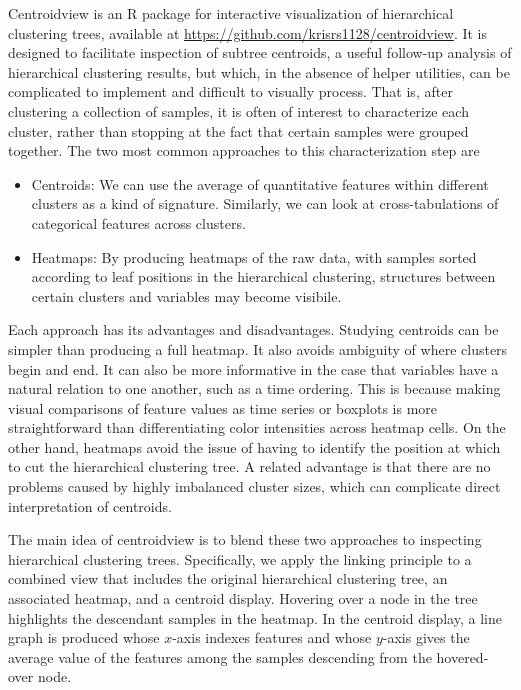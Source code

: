 Centroidview is an R package for interactive visualization of hierarchical
clustering trees, available at \url{https://github.com/krisrs1128/centroidview}.
It is designed to facilitate inspection of subtree centroids, a useful follow-up
analysis of hierarchical clustering results, but which, in the absence of helper
utilities, can be complicated to implement and difficult to visually process.
That is, after clustering a collection of samples, it is often of interest to
characterize each cluster, rather than stopping at the fact that certain samples
were grouped together. The two most common approaches to this characterization
step are
\begin{itemize}
\item Centroids: We can use the average of quantitative features within
  different clusters as a kind of signature. Similarly, we can look at
  cross-tabulations of categorical features across clusters.
\item Heatmaps: By producing heatmaps of the raw data, with samples sorted
  according to leaf positions in the hierarchical clustering, structures between
  certain clusters and variables may become visibile.
\end{itemize}
Each approach has its advantages and disadvantages. Studying centroids can be
simpler than producing a full heatmap. It also avoids ambiguity of where
clusters begin and end. It can also be more informative in the case that
variables have a natural relation to one another, such as a time ordering. This
is because making visual comparisons of feature values as time series or
boxplots is more straightforward than differentiating color intensities across
heatmap cells. On the other hand, heatmaps avoid the issue of having to identify
the position at which to cut the hierarchical clustering tree. A related
advantage is that there are no problems caused by highly imbalanced cluster
sizes, which can complicate direct interpretation of centroids.

The main idea of centroidview is to blend these two approaches to inspecting
hierarchical clustering trees. Specifically, we apply the linking principle to a
combined view that includes the original hierarchical clustering tree, an
associated heatmap, and a centroid display. Hovering over a node in the tree
highlights the descendant samples in the heatmap. In the centroid display, a
line graph is produced whose $x$-axis indexes features and whose $y$-axis gives
the average value of the features among the samples descending from the
hovered-over node.

